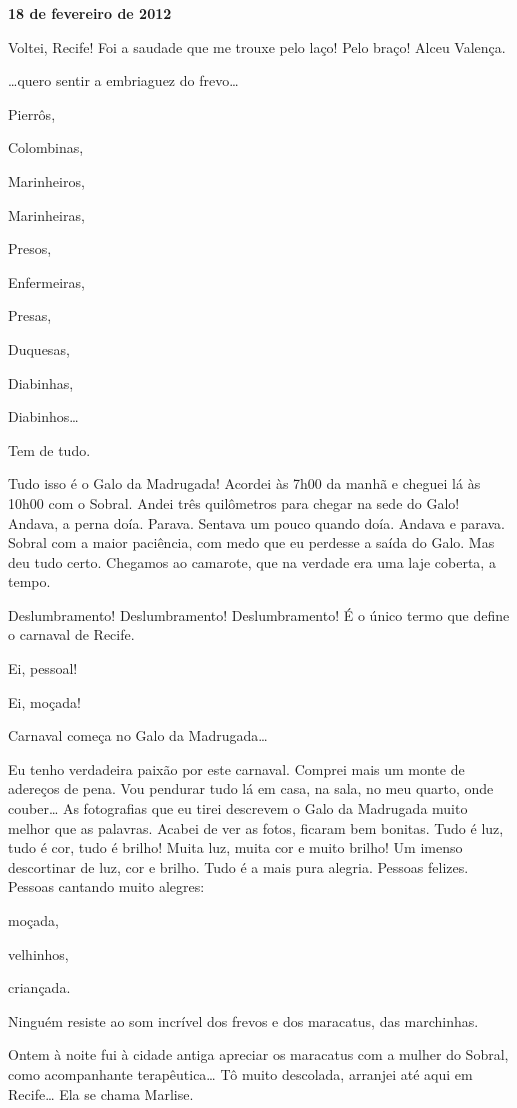 \begin{flushright}\textbf{18 de fevereiro de 2012}\end{flushright}


Voltei, Recife! Foi a saudade que me trouxe pelo laço! Pelo
braço! Alceu Valença.

…quero sentir a embriaguez do frevo…

Pierrôs,

Colombinas,

Marinheiros,

Marinheiras,

Presos,

Enfermeiras,

Presas,

Duquesas,

Diabinhas,

Diabinhos…

Tem de tudo.

Tudo isso é o Galo da Madrugada! Acordei às 7h00 da manhã e cheguei lá
às 10h00 com o Sobral. Andei três quilômetros para chegar na sede do
Galo! Andava, a perna doía. Parava. Sentava um pouco quando doía.
Andava e parava. Sobral com a maior paciência, com medo que eu perdesse
a saída do Galo. Mas deu tudo certo. Chegamos ao camarote, que na
verdade era uma laje coberta, a tempo.

Deslumbramento! Deslumbramento! Deslumbramento! É o único termo que
define o carnaval de Recife.

Ei, pessoal!

Ei, moçada!

Carnaval começa no Galo da Madrugada…

Eu tenho verdadeira paixão por este carnaval. Comprei mais um monte de
adereços de pena. Vou pendurar tudo lá em casa, na sala, no meu quarto,
onde couber… As fotografias que eu tirei descrevem o Galo da
Madrugada muito melhor que as palavras. Acabei de ver as fotos, ficaram
bem bonitas. Tudo é luz, tudo é cor, tudo é brilho! Muita luz, muita cor
e muito brilho! Um imenso descortinar de luz, cor e brilho. Tudo é a
mais pura alegria. Pessoas felizes. Pessoas cantando muito alegres:

moçada,

velhinhos,

criançada.

Ninguém resiste ao som incrível dos frevos e dos maracatus, das
marchinhas.

Ontem à noite fui à cidade antiga apreciar os maracatus com a mulher do
Sobral, como acompanhante terapêutica… Tô muito descolada,
arranjei até  aqui em Recife… Ela se chama Marlise.


